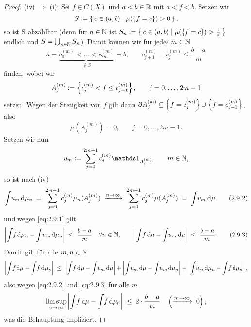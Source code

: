 \documentclass[../main/main.tex]{subfiles}
\begin{document}
\begin{proof}
		(iv) $\Rightarrow$ (i): Sei $f \in C(X)$ und $a < b \in \mathbb{R}$ 
		mit $a < f < b$. Setzen wir
		$$S \vcentcolon = \left\{\, c \in (a, b) \; | \; \mu(\left\{f = c\right\}) > 0 \,\right\} \text{,}$$
		so ist S abzählbar (denn für $n \in \mathbb{N}$ ist 
		$S_n \vcentcolon = \left\{\, c \in (a, b) \; | \; \mu(\left\{f = c\right\}) > \frac{1}{n} \,\right\}$ 
		endlich und $S = \bigcup_{n \in \mathbb{N}} S_n$).
		Damit können wir für jedes $m \in \mathbb{N}$ 
		\[a = \underbrace{c_0^{(m)} < \dots < c_{2m}^{(m)}}_{\notin S} = 
			b \text{,} \qquad c_{j+1}^{(m)} - c_j^{(m)} \leq \frac{b-a}{m} 
			\label{eq:2.9.1} \tag{2.9.1}\]
		finden, wobei wir
		$$A_j^{(m)} \vcentcolon = \left\{c_j^{(m)} < f \leq c_{j+1}^{(m)}\right\}\text{,}
			 \qquad j = 0,\dots,2m-1$$
		setzen. 
		Wegen der Stetigkeit von $f$ gilt dann 
		$\partial A_j^{(m)} \subseteq \left\{f = c_j^{(m)}\right\} \cup \left\{f = c_{j+1}^{(m)}\right\}$, 
		also 
		$$\mu(A_j^{(m)}) = 0 \text{,} \qquad j = 0,\dots,2m-1 \text{.}$$
		Setzen wir nun
		$$u_m \defby \sum_{j=0}^{2m-1} c_j^{(m)} \indfct_{A_j^{(m)}} 
			\text{,} \qquad m \in \N \text{,}$$
		so ist nach (iv)
		\[\int_{} \, u_m \, \mathrm{d}\mu_n \; = \; \sum_{j=0}^{2m-1} c_j^{(m)} \mu_n(A_j^{(m)}) 
			\; \xrightarrow{n \to \infty} \; \sum_{j=0}^{2m-1} c_j^{(m)} \mu(A_j^{(m)}) \; = \; 
			\int_{} \, u_m \, \mathrm{d}\mu \label{eq:2.9.2} \tag{2.9.2}\]
		und wegen \eqref{eq:2.9.1} gilt
		\[\left| \int_{} \, f \, \mathrm{d}\mu_n - \int_{} \, u_m \, \mathrm{d}\mu_n \right| \; \leq \; 
			\frac{b-a}{m} \quad \forall n \in \mathbb{N} \text{,} \qquad 
			\left| \int_{} \, f \, \mathrm{d}\mu - \int_{} \, u_m \, \mathrm{d}\mu \right| \; \leq \; 
			\frac{b-a}{m} \text{.} \label{eq:2.9.3} \tag{2.9.3}\]
		Damit gilt für alle $m, n \in \mathbb{N}$
		$$ \left| \int_{} \, f \, \mathrm{d}\mu - \int_{} \, f \, \mathrm{d}\mu_n \right| \; \leq \; 
			\left| \int_{} \, f \, \mathrm{d}\mu - \int_{} \, u_m \, \mathrm{d}\mu \right| + 
			\left| \int_{} \, u_m \, \mathrm{d}\mu - \int_{} \, u_m \, \mathrm{d}\mu_n \right| + 
			\left| \int_{} \, u_m \, \mathrm{d}\mu_n - \int_{} \, f \, \mathrm{d}\mu_n \right| \text{,}$$
		also wegen \eqref{eq:2.9.2} und \eqref{eq:2.9.3} für alle $m$
		$$ \limsup_{n \to \infty} \left| \int_{} \, f \, \mathrm{d}\mu - \int_{} \, f \, \mathrm{d}\mu_n \right|
			 \; \leq \; 2 \cdot \frac{b-a}{m} \quad 
			 \left(\xrightarrow{m \to \infty} \; 0\right) \text{,}$$
		was die Behauptung impliziert.
	\end{proof}

	
	
\end{document}
